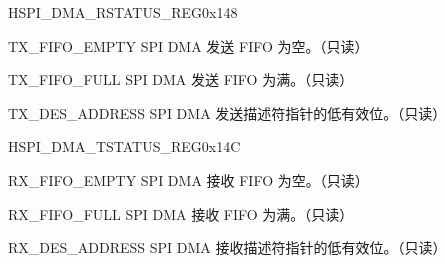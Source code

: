 \begin{register}{H}{SPI\_DMA\_RSTATUS\_REG}{0x148}\label{regdesc:SPIDMARSTATUSREG}
%
%
%
%
\regnewline%
\begin{regdesc}\begin{reglist}
\item [TX\_FIFO\_EMPTY]SPI DMA 发送 FIFO 为空。（只读）
\item [TX\_FIFO\_FULL]SPI DMA 发送 FIFO 为满。（只读）
\item [TX\_DES\_ADDRESS]SPI DMA 发送描述符指针的低有效位。（只读）
\end{reglist}\end{regdesc}
\end{register}


\begin{register}{H}{SPI\_DMA\_TSTATUS\_REG}{0x14C}\label{regdesc:SPIDMATSTATUSREG}
%
%
%
%
\regnewline%
\begin{regdesc}\begin{reglist}
\item [RX\_FIFO\_EMPTY]SPI DMA 接收 FIFO 为空。（只读）
\item [RX\_FIFO\_FULL]SPI DMA 接收 FIFO 为满。（只读）
\item [RX\_DES\_ADDRESS]SPI DMA 接收描述符指针的低有效位。（只读）
\end{reglist}\end{regdesc}
\end{register}




